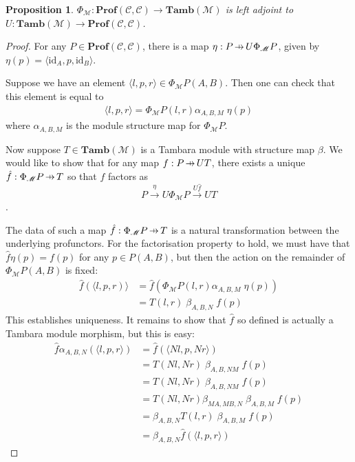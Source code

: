 \documentclass[11pt,a4paper]{article}
\theoremstyle{plain}
\newtheorem{proposition}[theorem]{Proposition}
\theoremstyle{definition}
\newcommand{\C}{\mathscr{C}}
\newcommand{\M}{\mathscr{M}}
\newcommand{\Pastro}{\Phi}
\newcommand{\Prof}{\mathbf{Prof}}
\newcommand{\Tamb}{\mathbf{Tamb}}
\newcommand{\id}{\mathrm{id}}
\newcommand{\hto}{\ensuremath{\,\mathaccent\shortmid\rightarrow\,}}
\begin{document}
\begin{proposition}
$\Pastro_\M : \Prof(\C, \C) \to \Tamb(\M)$ is left adjoint to $U : \Tamb(\M) \to \Prof(\C, \C)$.
\end{proposition}
\begin{proof}
For any $P \in \Prof(\C, \C)$, there is a map $\eta : P \hto U \Phi_\M P$, given by $\eta(p) = \langle \id_A, p, \id_B \rangle$.

Suppose we have an element $\langle l, p, r \rangle \in \Pastro_\M P(A,B)$. Then one can check that this element is equal to 
\begin{align*}
\langle l, p, r \rangle = \Pastro_\M P(l, r) \alpha_{A, B, M} \; \eta(p)
\end{align*}
where $\alpha_{A, B, M}$ is the module structure map for $\Pastro_\M P$.

Now suppose $T \in \Tamb(\M)$ is a Tambara module with structure map $\beta$. We would like to show that for any map $f : P \hto UT$, there exists a unique $\hat f : \Phi_\M P \hto T$ so that $f$ factors as \[P \xrightarrow{\eta} U \Phi_\M P \xrightarrow{U\hat f} UT \].

The data of such a map $\hat f : \Phi_\M P \hto T$ is a natural transformation between the underlying profunctors. For the factorisation property to hold, we must have that $\hat{f}\eta(p) = f(p)$ for any $p \in P(A,B)$, but then the action on the remainder of $\Phi_\M P(A, B)$ is fixed:
\begin{align*}
\hat{f}(\langle l, p, r) \rangle &= \hat{f}(\Pastro_\M P(l, r) \alpha_{A, B, M} \; \eta(p)) \\
&=T(l, r) \; \beta_{A, B, N} \; f(p)
\end{align*}
This establishes uniqueness. It remains to show that $\hat{f}$ so defined is actually a Tambara module morphism, but this is easy:
\begin{align*}
\hat{f}\alpha_{A,B,N}(\langle l, p, r \rangle)
&= \hat{f}(\langle Nl, p, Nr \rangle) \\
&= T(Nl, Nr) \; \beta_{A, B, NM} \; f(p) \\
&= T(Nl, Nr) \; \beta_{A, B, NM} \; f(p) \\
&= T(Nl, Nr) \beta_{MA,MB,N} \; \beta_{A, B, M} \; f(p) \\
&= \beta_{A,B,N} T(l, r) \; \beta_{A, B, M} \; f(p) \\
&= \beta_{A,B,N} \hat{f} (\langle l, p, r \rangle)
\end{align*}
\end{proof}
\end{document}
